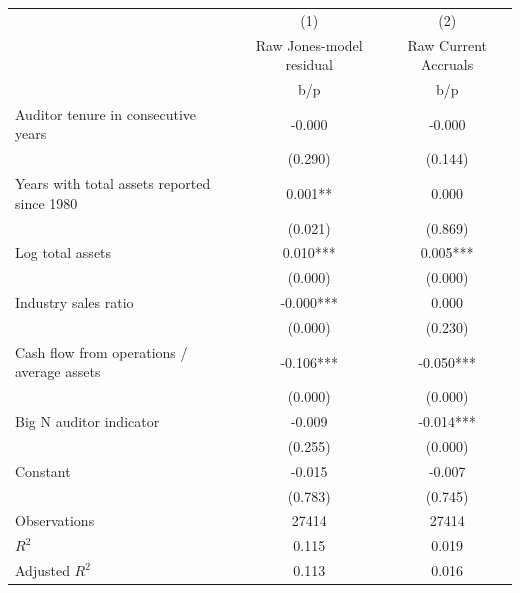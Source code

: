 {
\def\sym#1{\ifmmode^{#1}\else\(^{#1}\)\fi}
\begin{tabular}{l*{2}{c}}
\hline\hline
                    &\multicolumn{1}{c}{(1)}&\multicolumn{1}{c}{(2)}\\
                    &\multicolumn{1}{c}{Raw Jones-model residual}&\multicolumn{1}{c}{Raw Current Accruals}\\
                    &         b/p   &         b/p   \\
\hline
Auditor tenure in consecutive years&      -0.000   &      -0.000   \\
                    &     (0.290)   &     (0.144)   \\
Years with total assets reported since 1980&       0.001** &       0.000   \\
                    &     (0.021)   &     (0.869)   \\
Log total assets    &       0.010***&       0.005***\\
                    &     (0.000)   &     (0.000)   \\
Industry sales ratio&      -0.000***&       0.000   \\
                    &     (0.000)   &     (0.230)   \\
Cash flow from operations / average assets&      -0.106***&      -0.050***\\
                    &     (0.000)   &     (0.000)   \\
Big N auditor indicator&      -0.009   &      -0.014***\\
                    &     (0.255)   &     (0.000)   \\
Constant            &      -0.015   &      -0.007   \\
                    &     (0.783)   &     (0.745)   \\
\hline
Observations        &       27414   &       27414   \\
\(R^{2}\)           &       0.115   &       0.019   \\
Adjusted \(R^{2}\)  &       0.113   &       0.016   \\
\hline\hline
\end{tabular}
}
